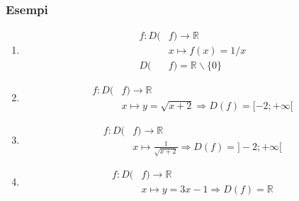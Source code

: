 \documentclass[../main.tex]{subfiles}
\begin{document}
\subsubsection{Esempi}
\begin{enumerate}
    \item \begin{align*}
        f:D(&f) \rightarrow \mathbb{R} \\
        &x \mapsto f(x)=1/x \\
        D(&f)= \mathbb{R} \backslash \{0\}
    \end{align*}
    \item \begin{align*}
        f:D(&f) \rightarrow \mathbb{R} \\
        &x \mapsto y=\sqrt{x+2} \Rightarrow D(f)=\lbrack -2;+ \infty \lbrack
    \end{align*}
    \item \begin{align*}
        f:D(&f) \rightarrow \mathbb{R} \\
        &x \mapsto \frac{1}{\sqrt{x+2}} \Rightarrow D(f)= \rbrack -2;+\infty \lbrack
    \end{align*}
    \item \begin{align*}
        f:D(&f) \rightarrow \mathbb{R} \\
        &x \mapsto y=3x-1 \Rightarrow D(f)= \mathbb{R}
    \end{align*}
\end{enumerate}
\end{document}
